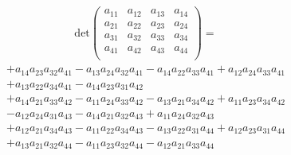 \documentclass[a4paper,11pt]{jsarticle}
\begin{document}
\begin{align*}
  \text{det} \begin{pmatrix}
    a_{11} & a_{12} & a_{13} & a_{14} \\
    a_{21} & a_{22} & a_{23} & a_{24} \\
    a_{31} & a_{32} & a_{33} & a_{34} \\
    a_{41} & a_{42} & a_{43} & a_{44} \\
  \end{pmatrix}
  =
\end{align*}
\[
  \begin{aligned}
    + a_{14} a_{23} a_{32} a_{41} - a_{13} a_{24} a_{32} a_{41} - a_{14} a_{22} a_{33} a_{41} + a_{12} a_{24} a_{33} a_{41} \\
    + a_{13} a_{22} a_{34} a_{41} - a_{14} a_{23} a_{31} a_{42} \\
    + a_{14} a_{21} a_{33} a_{42} - a_{11} a_{24} a_{33} a_{42} - a_{13} a_{21} a_{34} a_{42} + a_{11} a_{23} a_{34} a_{42} \\
     - a_{12} a_{24} a_{31} a_{43} - a_{14} a_{21} a_{32} a_{43} + a_{11} a_{24} a_{32} a_{43} \\
    + a_{12} a_{21} a_{34} a_{43} - a_{11} a_{22} a_{34} a_{43} - a_{13} a_{22} a_{31} a_{44} + a_{12} a_{23} a_{31} a_{44} \\
    + a_{13} a_{21} a_{32} a_{44} - a_{11} a_{23} a_{32} a_{44} - a_{12} a_{21} a_{33} a_{44}
  \end{aligned}
\]
\end{document}
